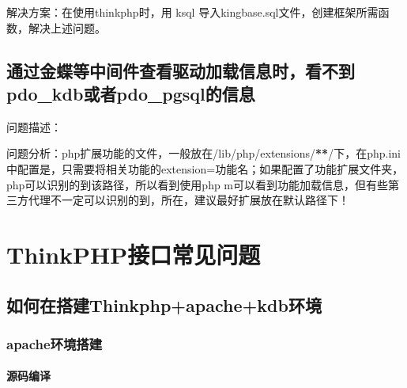 \documentclass[a4,10pt,oneside,english]{sphinxmanual}
\begin{document}
\begin{figure}[H]
\centering

\noindent{}
\end{figure}

解决方案：在使用thinkphp时，用 ksql 导入kingbase.sql文件，创建框架所需函数，解决上述问题。


\subsection{通过金蝶等中间件查看驱动加载信息时，看不到pdo\_kdb或者pdo\_pgsql的信息}
\label{\detokenize{interface/pdo:pdo-kdbpdo-pgsql}}
问题描述：

\begin{figure}[H]
\centering

\noindent{}
\end{figure}

\begin{figure}[H]
\centering

\noindent{}
\end{figure}

问题分析：php扩展功能的文件，一般放在/lib/php/extensions/{\color{red}\bfseries{}**}/下，在php.ini中配置是，只需要将相关功能的extension=功能名；如果配置了功能扩展文件夹，php可以识别的到该路径，所以看到使用php \sphinxhyphen{}m可以看到功能加载信息，但有些第三方代理不一定可以识别的到，所在，建议最好扩展放在默认路径下！


\section{ThinkPHP接口常见问题}
\label{\detokenize{interface/thinkPHP:thinkphp}}\label{\detokenize{interface/thinkPHP::doc}}

\subsection{如何在搭建Thinkphp+apache+kdb环境}
\label{\detokenize{interface/thinkPHP:thinkphp-apache-kdb}}

\subsubsection{apache环境搭建}
\label{\detokenize{interface/thinkPHP:apache}}

\paragraph{源码编译}
\label{\detokenize{interface/thinkPHP:id1}}
\begin{sphinxVerbatim}[commandchars=\\\{\}]
\end{sphinxVerbatim}
\end{document}
